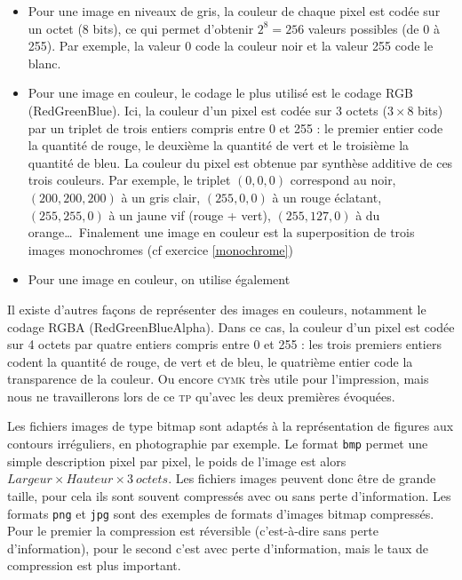 \documentclass[10pt,a4paper,pdftex]{book}
\begin{document}
\smallskip
\begin{itemize}
	\item Pour une image en niveaux de gris, la couleur de chaque pixel est codée sur un octet (8 bits), ce qui permet d'obtenir $2^8 = 256$ valeurs possibles (de 0 à 255). Par exemple, la valeur 0 code la couleur noir et la valeur 255 code le blanc.
	\item Pour une image en couleur, le codage le plus utilisé est le codage RGB (RedGreenBlue). Ici, la couleur d'un pixel est codée
sur 3 octets ($3\times 8$ bits) par un triplet de trois entiers compris entre 0 et 255 : le premier entier code la quantité de rouge, le deuxième la quantité de vert et le troisième la quantité de bleu. La couleur du pixel est obtenue par synthèse additive de ces trois couleurs. Par exemple, le triplet $(0, 0, 0)$ correspond au noir, $(200, 200, 200)$ à un gris clair, $(255, 0, 0)$ à un rouge éclatant, $(255, 255, 0)$ à un jaune vif (rouge + vert), $(255, 127, 0)$ à du orange\dots\ Finalement une image en couleur est la superposition de trois images monochromes (cf exercice \ref{monochrome})
	\item Pour une image en couleur, on utilise également 
\end{itemize}

\medskip
Il existe d'autres façons de représenter des images en couleurs, notamment le codage RGBA (RedGreenBlueAlpha). Dans ce cas, la couleur d'un pixel est codée sur 4 octets par quatre entiers compris entre 0 et 255 : les trois premiers entiers codent la quantité de rouge, de vert et de bleu, le quatrième entier code la transparence de la couleur. Ou encore \og \textsc{cymk}\fg{} très utile pour l'impression, mais nous ne travaillerons lors de ce \textsc{tp} qu'avec les deux premières évoquées.

\medskip

Les fichiers images de type bitmap sont adaptés à la représentation de figures aux contours irréguliers, en photographie par exemple. Le format \texttt{bmp} permet une simple description pixel par pixel, le poids de l'image est alors $Largeur\times Hauteur\times 3\ octets$. Les fichiers images peuvent donc être de grande taille, pour cela ils sont souvent compressés avec ou sans perte d'information.
Les formats \texttt{png} et \texttt{jpg} sont des exemples de formats d'images bitmap compressés. Pour le premier la compression est réversible (c'est-à-dire sans perte d'information), pour le second c'est avec perte d'information, mais le taux de compression est plus important.
\end{document}
